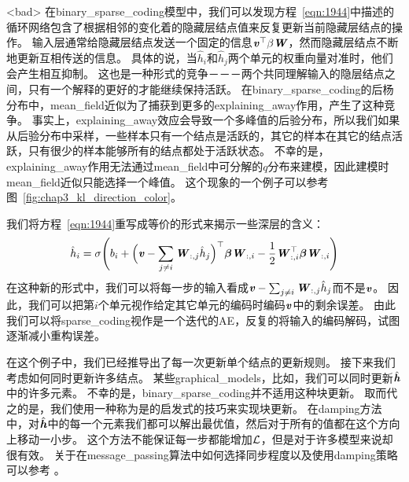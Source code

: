 <bad>
在\gls{binary_sparse_coding}模型中，我们可以发现方程~\eqref{eqn:1944}中描述的循环网络包含了根据相邻的变化着的隐藏层结点值来反复更新当前隐藏层结点的操作。
输入层通常给隐藏层结点发送一个固定的信息$\boldsymbol{\mathit{v}}^{\top}\beta\boldsymbol{\mathit{W}}$，然而隐藏层结点不断地更新互相传送的信息。
具体的说，当$\hat{h}_i$和$\hat{h}_j$两个单元的权重向量对准时，他们会产生相互抑制。
这也是一种形式的竞争－－－两个共同理解输入的隐层结点之间，只有一个解释的更好的才能继续保持活跃。
在\gls{binary_sparse_coding}的后杨分布中，\gls{mean_field}近似为了捕获到更多的\gls{explaining_away}作用，产生了这种竞争。
事实上，\gls{explaining_away}效应会导致一个多峰值的后验分布，所以我们如果从后验分布中采样，一些样本只有一个结点是活跃的，其它的样本在其它的结点活跃，只有很少的样本能够所有的结点都处于活跃状态。
不幸的是，\gls{explaining_away}作用无法通过\gls{mean_field}中可分解的$q$分布来建模，因此建模时\gls{mean_field}近似只能选择一个峰值。
这个现象的一个例子可以参考图~\ref{fig:chap3_kl_direction_color}。




我们将方程~\eqref{eqn:1944}重写成等价的形式来揭示一些深层的含义：
\begin{align}
\hat{h}_i = \sigma\Bigg(b_i + \Big(\boldsymbol{\mathit{v}} - \sum_{j\neq i} \boldsymbol{\mathit{W}}_{:,j}\hat{h}_j\Big)^{\top} {\boldsymbol{\beta}}\boldsymbol{\mathit{W}}_{:,i} - \frac{1}{2} \boldsymbol{\mathit{W}}_{:,i}^{\top} {\boldsymbol{\beta}} \boldsymbol{\mathit{W}}_{:,i}\Bigg) 
\end{align}
在这种新的形式中，我们可以将每一步的输入看成$\boldsymbol{\mathit{v}} - \sum_{j\neq i} \boldsymbol{\mathit{W}}_{:,j}\hat{h}_j$而不是$\boldsymbol{\mathit{v}}$。
因此，我们可以把第$i$个单元视作给定其它单元的编码时编码$\boldsymbol{\mathit{v}}$中的剩余误差。
由此我们可以将\gls{sparse_coding}视作是一个迭代的\gls{AE}，反复的将输入的编码解码，试图逐渐减小重构误差。


在这个例子中，我们已经推导出了每一次更新单个结点的更新规则。
接下来我们考虑如何同时更新许多结点。
某些\gls{graphical_models}，比如，我们可以同时更新$\hat{\boldsymbol{\mathit{h}}}$中的许多元素。
不幸的是，\gls{binary_sparse_coding}并不适用这种块更新。
取而代之的是，我们使用一种称为是的启发式的技巧来实现块更新。
在\gls{damping}方法中，对$\hat{\boldsymbol{\mathit{h}}}$中的每一个元素我们都可以解出最优值，然后对于所有的值都在这个方向上移动一小步。
这个方法不能保证每一步都能增加$\mathcal{L}$，但是对于许多模型来说却很有效。
关于在\gls{message_passing}算法中如何选择同步程度以及使用\gls{damping}策略可以参考\citet{koller-book2009} 。




\subsection{}
\label{sec:calculus_of_variations}

